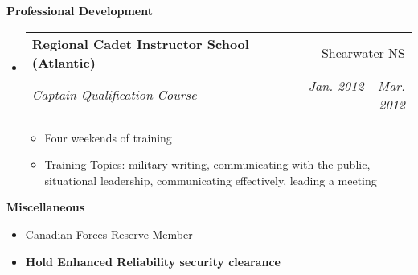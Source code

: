\documentclass[letterpaper,11pt]{article}
\makeatletter
\newcommand{\resitem}[1]{\item #1 \vspace{-2pt}}
\newcommand{\resheading}[1]{{\large \colorbox{mygrey}{\begin{minipage}{\textwidth}{\textbf{#1 \vphantom{p\^{E}} }}\end{minipage}} }}
\newcommand{\ressubheading}[4]{
\begin{tabular*}{6.5in}{l@{\extracolsep{\fill}}r}
        \textbf{#1} & #2 \\
        \textit{#3} & \textit{#4} \\
\end{tabular*}\vspace{-6pt}}
\makeatother
\begin{document}
\resheading{Professional Development} %
    \begin{itemize}
        \item[]
            \ressubheading{Regional Cadet Instructor School (Atlantic)}{Shearwater NS}{Captain Qualification Course}{Jan. 2012 - Mar. 2012}
            \begin{itemize}
                \resitem{Four weekends of training}
                \resitem{Training Topics: military writing, communicating with the public, situational leadership, communicating effectively, leading a meeting}
            \end{itemize}
\begin{comment}
        \item[]
            \ressubheading{Regional Cadet Instructor School (Atlantic)}{Shearwater NS}{Lieutenant Qualification Course}{Oct. 2010 - 4 Dec. 2010}
            \begin{itemize}
                \resitem{Four weekends of training}
                \resitem{Training Topics: military writing, counseling, developing a training schedule}
            \end{itemize}
        \item[]
            \ressubheading{Regional Cadet Instructor School (Atlantic)}{Gagetown NB}{Military Occupation Code Course}{June 2007}
            \begin{itemize}
                \resitem{Ten days of training}
                \resitem{Training Topics: seamanship, sailing, lifting devices, nautical navigation}
            \end{itemize}
        \item[]
            \ressubheading{Regional Cadet Instructor School (Atlantic)}{Gagetown NB}{Basic Officer Qualification}{June 2007}
            \begin{itemize}
                \resitem{Ten days of training}
                \resitem{Training Topics: military writing, drill, instruction, military ranks and processes}
            \end{itemize}
\end{comment}
    \end{itemize}

\resheading{{Miscellaneous}} %
    \begin{itemize}
        \item Canadian Forces Reserve Member
        \item \bf Hold Enhanced Reliability security clearance
    \end{itemize}
\end{document}

